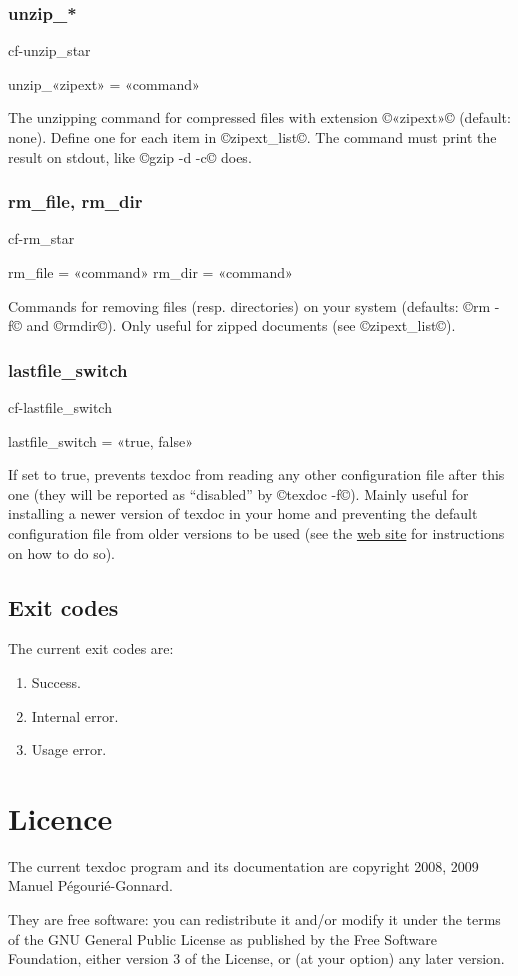 \documentclass[a4paper, oneside]{scrartcl}
\newif\ifframed
\newenvironment{cmdsubsub}[2]{%
  \framedfalse \commandes\subsubsection{#1}{#2}%
  }{%
  \endcommandes}
\begin{document}
\begin{cmdsubsub}{unzip_*}{cf-unzip_star}
  unzip_«zipext» = «command»
\end{cmdsubsub}

The unzipping command for compressed files with extension ©«zipext»© (default:
none). Define one for each item in ©zipext_list©. The command must print
the result on stdout, like ©gzip -d -c© does.

\begin{cmdsubsub}{rm_file, rm_dir}{cf-rm_star}
  rm_file = «command»
  rm_dir  = «command»
\end{cmdsubsub}

Commands for removing files (resp. directories) on your system (defaults:
©rm -f© and ©rmdir©). Only useful for zipped documents (see ©zipext_list©).

\begin{cmdsubsub}{lastfile_switch}{cf-lastfile_switch}
  lastfile_switch = «true, false»
\end{cmdsubsub}

If set to true, prevents texdoc from reading any other configuration file
after this one (they will be reported as ``disabled'' by ©texdoc -f©).  Mainly
useful for installing a newer version of texdoc in your home and preventing
the default configuration file from older versions to be used (see the
\href{http://tug.org/texdoc/}{web site} for instructions on how to do so).

\subsection{Exit codes}\label{ss-exit}

The current exit codes are:
\begin{enumerate}[start=0]
  \item Success.
  \item Internal error.
  \item Usage error.
\end{enumerate}

\section{Licence}\label{s-licence}

The current texdoc program and its documentation are copyright 2008, 2009
Manuel Pégourié-Gonnard.

They are free software: you can redistribute it and/or modify it under the
terms of the GNU General Public License as published by the Free Software
Foundation, either version 3 of the License, or (at your option) any later
version.
\end{document}
